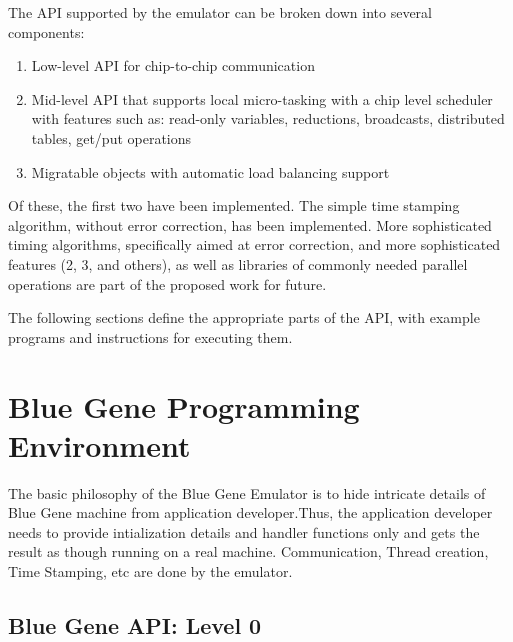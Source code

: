 \documentclass[10pt]{article}
\begin{document}
The API supported by the emulator can be broken down into several
components:

\begin{enumerate}
\item Low-level API for chip-to-chip communication
\item Mid-level API that supports local micro-tasking with a chip level
scheduler with features such as: read-only variables, reductions, broadcasts,
distributed tables, get/put operations
\item Migratable objects with automatic load balancing support
\end{enumerate}

Of these, the first two have been implemented.  The simple time stamping
algorithm, without error correction, has been implemented.  More
sophisticated timing algorithms, specifically aimed at error correction,
and more sophisticated features (2, 3, and others), as well as libraries
of commonly needed parallel operations are part of the proposed work for
future.

The following sections define the appropriate parts of the API, with
example programs and instructions for executing them.

\section{Blue Gene Programming Environment}

The basic philosophy of the Blue Gene Emulator is to hide intricate details
of Blue Gene machine from
application developer.Thus, the application developer needs to provide
intialization details and handler
functions only and gets the result as though running on a real machine.
Communication, Thread creation,
Time Stamping, etc are done by the emulator.

\subsection{Blue Gene API: Level 0}



\end{document}

